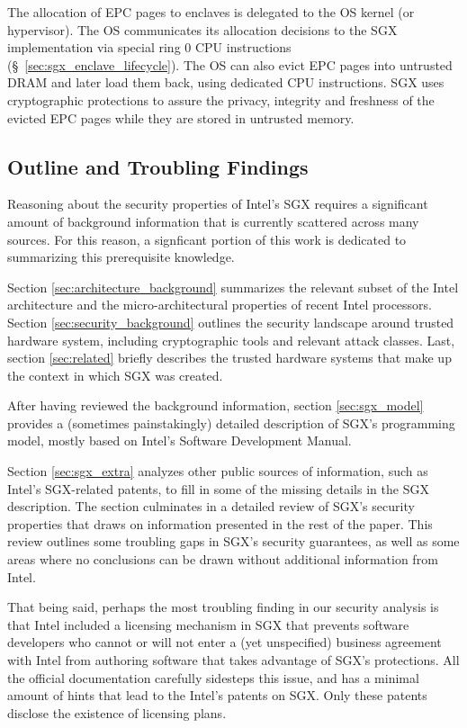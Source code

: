 The allocation of EPC pages to enclaves is delegated to the OS kernel (or
hypervisor). The OS communicates its allocation decisions to the SGX
implementation via special ring 0 CPU instructions
(\S~\ref{sec:sgx_enclave_lifecycle}). The OS can also evict EPC pages into
untrusted DRAM and later load them back, using dedicated CPU instructions. SGX
uses cryptographic protections to assure the privacy, integrity and freshness
of the evicted EPC pages while they are stored in untrusted memory.


\subsection{Outline and Troubling Findings}
\label{sec:intro_troubles}

Reasoning about the security properties of Intel's SGX requires a significant
amount of background information that is currently scattered across many
sources. For this reason, a signficant portion of this work is dedicated to
summarizing this prerequisite knowledge.

Section \ref{sec:architecture_background} summarizes the relevant subset of the
Intel architecture and the micro-architectural properties of recent Intel
processors. Section \ref{sec:security_background} outlines the security
landscape around trusted hardware system, including cryptographic tools and
relevant attack classes. Last, section \ref{sec:related} briefly describes the
trusted hardware systems that make up the context in which SGX was created.

After having reviewed the background information, section \ref{sec:sgx_model}
provides a (sometimes painstakingly) detailed description of SGX's programming
model, mostly based on Intel's Software Development Manual.

Section \ref{sec:sgx_extra} analyzes other public sources of information, such
as Intel's SGX-related patents, to fill in some of the missing details in the
SGX description. The section culminates in a detailed review of SGX's security
properties that draws on information presented in the rest of the paper. This
review outlines some troubling gaps in SGX's security guarantees, as well as
some areas where no conclusions can be drawn without additional information
from Intel.

That being said, perhaps the most troubling finding in our security analysis is
that Intel included a licensing mechanism in SGX that prevents software
developers who cannot or will not enter a (yet unspecified) business agreement
with Intel from authoring software that takes advantage of SGX's protections.
All the official documentation carefully sidesteps this issue, and has a
minimal amount of hints that lead to the Intel's patents on SGX. Only these
patents disclose the existence of licensing plans.

